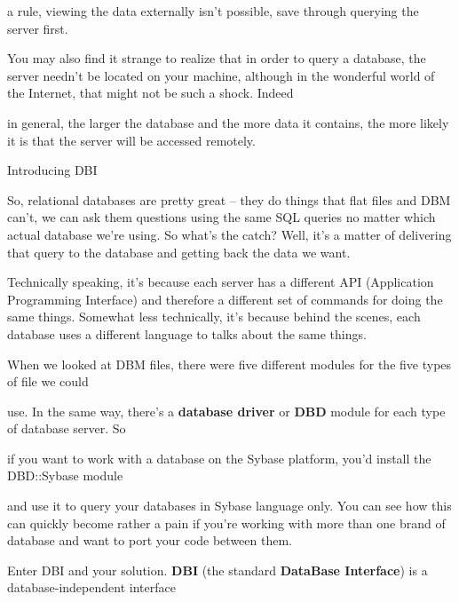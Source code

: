 \documentclass[a4paper,11pt]{book}
\begin{document}
\noindent a rule, viewing the data externally isn't possible, save through querying the server first.

\noindent 

\noindent You may also find it strange to realize that in order to query a database, the server needn't be located on your machine, although in the wonderful world of the Internet, that might not be such a shock. Indeed

\noindent in general, the larger the database and the more data it contains, the more likely it is that the server will be accessed remotely.

\noindent 

\noindent 

\noindent Introducing DBI

\noindent 

\noindent So, relational databases are pretty great -- they do things that flat files and DBM can't, we can ask them questions using the same SQL queries no matter which actual database we're using. So what's the catch? Well, it's a matter of delivering that query to the database and getting back the data we want.

\noindent 

\noindent Technically speaking, it's because each server has a different API (Application Programming Interface) and therefore a different set of commands for doing the same things. Somewhat less technically, it's because behind the scenes, each database uses a different language to talks about the same things.

\noindent 

\noindent When we looked at DBM  files,  there  were  five  different  modules  for the  five  types  of  file we  could

\noindent use.  In the same way,  there's  a  \textbf{database driver  }or  \textbf{DBD }module  for each  type  of  database  server.  So

\noindent if  you  want to  work with a database  on the  Sybase  platform,  you'd  install  the DBD::Sybase module

\noindent and use  it to  query your databases  in  Sybase  language  only.  You  can  see  how  this  can  quickly  become rather a  pain if you're working  with  more  than  one  brand  of  database  and want  to  port  your code between them.

\noindent 

\noindent 

\noindent Enter DBI and your solution. \textbf{DBI }(the standard \textbf{DataBase Interface})  is a database-independent interface
\end{document}
